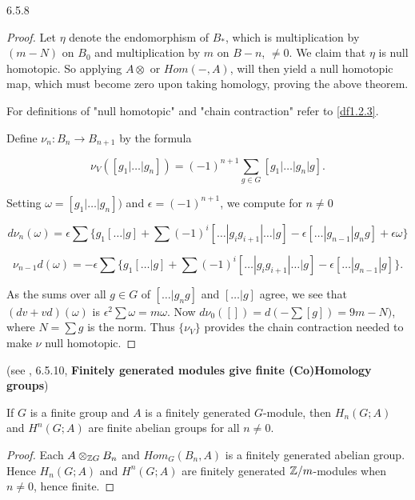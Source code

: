 6.5.8

\begin{proof}

Let $\eta$ denote the endomorphism of $B_*$, which is multiplication by
$(m-N)$ on $B_0$ and multiplication by $m$ on $B-n$, $\neq 0$. We claim
that $\eta$ is null homotopic. So applying $A\otimes$ or $Hom( - , A)$,
will then yield a null homotopic map, which must become zero upon taking
homology, proving the above theorem.

For definitions of "null homotopic" and "chain contraction" refer to \ref{df1.2.3}.

Define $\nu_n : B_n \rightarrow B_{n+1}$ by the formula

$$ \nu_V([g_1 | \dots | g_n ]) = (-1)^{n+1} \sum_{g\in G} [ g_1 | \dots
|g_n |g].$$

Setting $\omega = [g_1 | \dots |g_n])$ and $\epsilon = (-1)^{n+1}$, we
compute for $n\neq 0$

$$d\nu_n(\omega) = \epsilon \sum \{ g_1[\dots | g] + \sum (-1)^i [\dots
|g_i g_{i+1}| \dots | g] - \epsilon [\dots | g_{n-1} | g_n g] + \epsilon
\omega \}$$

$$\nu_{n-1} d (\omega) = - \epsilon \sum \{ g_1[\dots | g] + \sum (-1)^i
[\dots |g_i g_{i+1}| \dots | g] - \epsilon [\dots | g_{n-1} | g] \}.$$

As the sums over all $g \in G$ of $[\dots | g_n g ]$ and $[\dots | g]$
agree, we see that $(dv+vd)(\omega)$ is $\epsilon^2 \sum \omega =
m\omega$. Now $d\nu_0([]) = d(-\sum [g]) = 9m-N){}$, where $N = \sum g$ is
the norm. Thus $\{ \nu_V \}$ provides the chain contraction needed to make
$\nu$ null homotopic.

\end{proof}




\begin{corollary} (see \cite{Weibel}, 6.5.10, \textbf{Finitely generated modules give finite (Co)Homology groups}\label{6.5.10})

If $G$ is a finite group and $A$ is a finitely generated $G$-module, then $H_n(G;A)$ and $H^n(G;A)$ are finite abelian groups for all $n\neq 0$.

\end{corollary}

\begin{proof}
Each $A \otimes_{\mathbb Z G} B_n$ and $Hom_G(B_n , A)$ is a finitely generated
abelian group. Hence $H_n(G;A)$ and $H^n(G;A)$ are finitely generated $\mathbb Z
/ m$-modules when $n\neq 0$, hence finite.
\end{proof}

